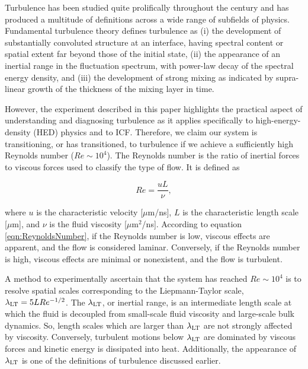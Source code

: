 \documentclass[%
 aip,
 amsmath,amssymb,
 reprint,
 floatfix
]{revtex4-1}
\begin{document}
Turbulence has been studied quite prolifically throughout the century and has produced a multitude of definitions across a wide range of subfields of physics.  \cite{RPD, dimotakis2000mixing,  dimonte2006k}  Fundamental turbulence theory defines turbulence as  (i) the development of substantially convoluted structure at an interface, having spectral content or spatial extent far beyond those of the initial state, (ii) the appearance of an inertial range in the fluctuation spectrum, with power-law decay of the spectral energy density, and (iii) the development of strong mixing as indicated by supra-linear growth of the thickness of the mixing layer in time. \cite{RPD}





However, the experiment described in this paper highlights the practical aspect of understanding and diagnosing turbulence as it applies specifically to high-energy-density (HED) physics and to ICF. Therefore, we claim our system is transitioning, or has transitioned, to turbulence if we achieve a sufficiently high Reynolds number ($Re \sim 10^4$). \cite{RPD, dimotakis2000mixing, dimonte2006k,Robey:2003, Zhou:2017, zhou2019turbulent}  The Reynolds number is the ratio of inertial forces to viscous forces used to classify the type of flow. It is defined as


\begin{equation}
Re = \frac{uL}{\nu},
\label{eqn:ReynoldsNumber}
\end{equation}

where $u$ is the characteristic  velocity [$\mu$m/ns], $L$ is the characteristic length scale [$\mu$m], and $\nu$ is the fluid viscosity [$\mu$m$^2$/ns]. According to equation \ref{eqn:ReynoldsNumber}, if the Reynolds number is low, viscous effects are apparent, and the flow is considered laminar.   Conversely, if the Reynolds number is high, viscous effects are minimal or nonexistent, and the flow is turbulent.  


 A method to experimentally ascertain that the system has reached $Re\sim 10^4$ is to resolve spatial scales corresponding to the Liepmann-Taylor scale,  $\lambda_{\rm{LT}} = 5LRe^{-1/2}$. \cite{zhou2019turbulent, zhou2003progress, zhou2007unification} The $\lambda_{\rm{LT}}$, or inertial range, is an intermediate length scale at which the fluid is decoupled from small-scale fluid viscosity and large-scale bulk dynamics. So, length scales which are larger than  $\lambda_{\rm{LT}}$ are not strongly affected by viscosity. Conversely, turbulent motions below  $\lambda_{\rm{LT}}$ are dominated by viscous forces and kinetic energy is dissipated into heat.  \cite{dimotakis2000mixing, Robey:2003} Additionally, the  appearance of $\lambda_{\rm{LT}}$ is one of the definitions of turbulence discussed earlier.  
 
\end{document}

